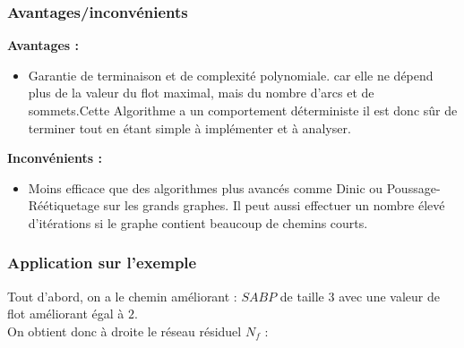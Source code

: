 \documentclass[a4paper]{article}
\begin{document}
\subsubsection{Avantages/inconvénients}
\textbf{Avantages :}
\begin{itemize}
    \item Garantie de terminaison et de complexité polynomiale. car elle ne dépend plus de la valeur du flot maximal, mais du nombre d'arcs et de sommets.Cette Algorithme a un comportement déterministe il est donc sûr de terminer tout en étant simple à implémenter et à analyser.
\end{itemize}

\textbf{Inconvénients :}
\begin{itemize}
    \item Moins efficace que des algorithmes plus avancés comme Dinic ou Poussage-Réétiquetage sur les grands graphes. Il peut aussi effectuer un nombre élevé d’itérations si le graphe contient beaucoup de chemins courts.
\end{itemize}
\subsubsection{Application sur l'exemple}
Tout d'abord, on a le chemin améliorant : $SABP$ de taille $3$ avec une valeur de flot améliorant égal à $2$.\\
On obtient donc à droite le réseau résiduel $N_f$ :
\end{document}
